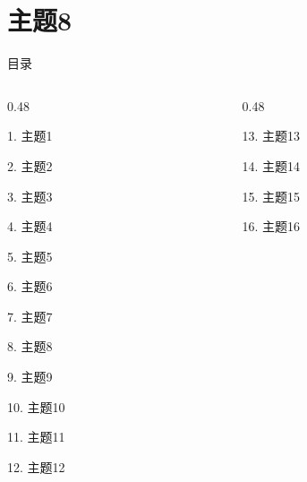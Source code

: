 \documentclass[aspectratio=169,10pt,fontset=fandol]{ctexbeamer}
\begin{document}
\section{主题8}
\begin{frame}[t,fragile]{目录}
\small
\begin{columns}[T,onlytextwidth]
\begin{column}{0.48\textwidth}
{\color{black}\small 1. 主题1\par}\vspace{0.22em}
{\color{black}\small 2. 主题2\par}\vspace{0.22em}
{\color{black}\small 3. 主题3\par}\vspace{0.22em}
{\color{black}\small 4. 主题4\par}\vspace{0.22em}
{\color{black}\small 5. 主题5\par}\vspace{0.22em}
{\color{black}\small 6. 主题6\par}\vspace{0.22em}
{\color{black}\small 7. 主题7\par}\vspace{0.22em}
{\color{blue}\small 8. 主题8\par}\vspace{0.22em}
{\color{gray!40}\small 9. 主题9\par}\vspace{0.22em}
{\color{gray!40}\small 10. 主题10\par}\vspace{0.22em}
{\color{gray!40}\small 11. 主题11\par}\vspace{0.22em}
{\color{gray!40}\small 12. 主题12\par}\vspace{0.22em}
\end{column}
\begin{column}{0.48\textwidth}
{\color{gray!40}\small 13. 主题13\par}\vspace{0.22em}
{\color{gray!40}\small 14. 主题14\par}\vspace{0.22em}
{\color{gray!40}\small 15. 主题15\par}\vspace{0.22em}
{\color{gray!40}\small 16. 主题16\par}\vspace{0.22em}

\end{column}
\end{columns}
\end{frame}
\end{document}
